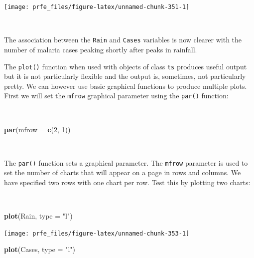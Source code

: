 \documentclass[12pt,a4paper]{book}
\newenvironment{Shaded}{\begin{snugshade}}{\end{snugshade}}
\newcommand{\KeywordTok}[1]{\textcolor[rgb]{0.13,0.29,0.53}{\textbf{#1}}}
\newcommand{\DataTypeTok}[1]{\textcolor[rgb]{0.13,0.29,0.53}{#1}}
\newcommand{\DecValTok}[1]{\textcolor[rgb]{0.00,0.00,0.81}{#1}}
\newcommand{\StringTok}[1]{\textcolor[rgb]{0.31,0.60,0.02}{#1}}
\newcommand{\NormalTok}[1]{#1}
\theoremstyle{definition}
\theoremstyle{definition}
\theoremstyle{definition}
\theoremstyle{remark}
\begin{document}
\begin{center}\texttt{[image: prfe\_files/figure-latex/unnamed-chunk-351-1]} \end{center}

~

The association between the \texttt{Rain} and \texttt{Cases} variables
is now clearer with the number of malaria cases peaking shortly after
peaks in rainfall.

The \texttt{plot()} function when used with objects of class \texttt{ts}
produces useful output but it is not particularly flexible and the
output is, sometimes, not particularly pretty. We can however use basic
graphical functions to produce multiple plots. First we will set the
\texttt{mfrow} graphical parameter using the \texttt{par()} function:

~

\begin{Shaded}
\begin{Highlighting}[]
\KeywordTok{par}\NormalTok{(}\DataTypeTok{mfrow =} \KeywordTok{c}\NormalTok{(}\DecValTok{2}\NormalTok{, }\DecValTok{1}\NormalTok{))}
\end{Highlighting}
\end{Shaded}

~

The \texttt{par()} function sets a graphical parameter. The
\texttt{mfrow} parameter is used to set the number of charts that will
appear on a page in rows and columns. We have specified two rows with
one chart per row. Test this by plotting two charts:

~

\begin{Shaded}
\begin{Highlighting}[]
\KeywordTok{plot}\NormalTok{(Rain, }\DataTypeTok{type =} \StringTok{"l"}\NormalTok{)}
\end{Highlighting}
\end{Shaded}

\begin{center}\texttt{[image: prfe\_files/figure-latex/unnamed-chunk-353-1]} \end{center}

\begin{Shaded}
\begin{Highlighting}[]
\KeywordTok{plot}\NormalTok{(Cases, }\DataTypeTok{type =} \StringTok{"l"}\NormalTok{)}
\end{Highlighting}
\end{Shaded}
\end{document}
